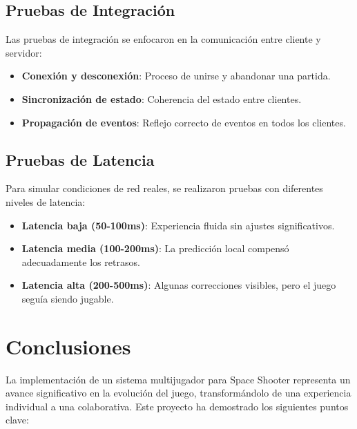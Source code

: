 \documentclass[11pt,letterpaper]{article}
\begin{document}
\subsection{Pruebas de Integración}

Las pruebas de integración se enfocaron en la comunicación entre cliente y servidor:

\begin{itemize}
    \item \textbf{Conexión y desconexión}: Proceso de unirse y abandonar una partida.
    \item \textbf{Sincronización de estado}: Coherencia del estado entre clientes.
    \item \textbf{Propagación de eventos}: Reflejo correcto de eventos en todos los clientes.
\end{itemize}

\subsection{Pruebas de Latencia}

Para simular condiciones de red reales, se realizaron pruebas con diferentes niveles de latencia:

\begin{itemize}
    \item \textbf{Latencia baja (50-100ms)}: Experiencia fluida sin ajustes significativos.
    \item \textbf{Latencia media (100-200ms)}: La predicción local compensó adecuadamente los retrasos.
    \item \textbf{Latencia alta (200-500ms)}: Algunas correcciones visibles, pero el juego seguía siendo jugable.
\end{itemize}

\section{Conclusiones}

La implementación de un sistema multijugador para Space Shooter representa un avance significativo en la evolución del juego, transformándolo de una experiencia individual a una colaborativa. Este proyecto ha demostrado los siguientes puntos clave:
\end{document}
